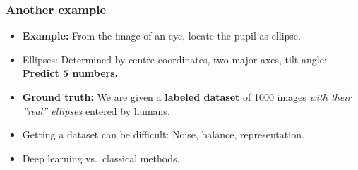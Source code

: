 \documentclass[10pt,hyperref={pdfpagelabels=false}]{beamer}
\begin{document}
\begin{frame}
    \frametitle{Another example}
    \begin{minipage}{.5\textwidth}
        {\small
        \begin{itemize}
            \item {\bf Example:} From the image of an eye, locate the pupil as ellipse.
            \item Ellipses: Determined by centre coordinates, two major axes, tilt angle: {\bf Predict 5 numbers.}
            \item {\bf Ground truth:} We are given a {\bf labeled dataset} of 1000 images \emph{with their ''real'' ellipses} entered by humans.
            \item Getting a dataset can be difficult: Noise, balance, representation.
            \item Deep learning vs.~classical methods.
        \end{itemize}
        }
    \end{minipage}
    \begin{minipage}{.4\textwidth}

\end{minipage}
\end{frame}
\end{document}
